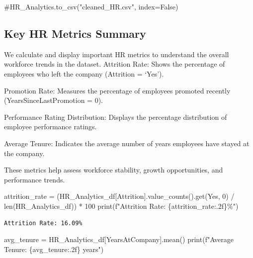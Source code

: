 \documentclass[
  letterpaper,
  DIV=11,
  numbers=noendperiod]{scrartcl}
\newenvironment{Shaded}{\begin{snugshade}}{\end{snugshade}}
\newcommand{\BuiltInTok}[1]{\textcolor[rgb]{0.00,0.23,0.31}{#1}}
\newcommand{\CommentTok}[1]{\textcolor[rgb]{0.37,0.37,0.37}{#1}}
\newcommand{\DecValTok}[1]{\textcolor[rgb]{0.68,0.00,0.00}{#1}}
\newcommand{\NormalTok}[1]{\textcolor[rgb]{0.00,0.23,0.31}{#1}}
\newcommand{\OperatorTok}[1]{\textcolor[rgb]{0.37,0.37,0.37}{#1}}
\newcommand{\SpecialCharTok}[1]{\textcolor[rgb]{0.37,0.37,0.37}{#1}}
\newcommand{\SpecialStringTok}[1]{\textcolor[rgb]{0.13,0.47,0.30}{#1}}
\newcommand{\StringTok}[1]{\textcolor[rgb]{0.13,0.47,0.30}{#1}}
\begin{document}
\begin{Shaded}
\begin{Highlighting}[]
\CommentTok{\#HR\_Analytics.to\_csv("cleaned\_HR.csv", index=False)}
\end{Highlighting}
\end{Shaded}

\subsection{Key HR Metrics Summary}\label{key-hr-metrics-summary}

We calculate and display important HR metrics to understand the overall
workforce trends in the dataset. Attrition Rate: Shows the percentage of
employees who left the company (Attrition = `Yes').

Promotion Rate: Measures the percentage of employees promoted recently
(YearsSinceLastPromotion = 0).

Performance Rating Distribution: Displays the percentage distribution of
employee performance ratings.

Average Tenure: Indicates the average number of years employees have
stayed at the company.

These metrics help assess workforce stability, growth opportunities, and
performance trends.

\begin{Shaded}
\begin{Highlighting}[]
\NormalTok{attrition\_rate }\OperatorTok{=}\NormalTok{ (HR\_Analytics\_df[}\StringTok{\textquotesingle{}Attrition\textquotesingle{}}\NormalTok{].value\_counts().get(}\StringTok{\textquotesingle{}Yes\textquotesingle{}}\NormalTok{, }\DecValTok{0}\NormalTok{) }\OperatorTok{/} \BuiltInTok{len}\NormalTok{(HR\_Analytics\_df)) }\OperatorTok{*} \DecValTok{100}
\BuiltInTok{print}\NormalTok{(}\SpecialStringTok{f"Attrition Rate: }\SpecialCharTok{\{}\NormalTok{attrition\_rate}\SpecialCharTok{:.2f\}}\SpecialStringTok{\%"}\NormalTok{)}
\end{Highlighting}
\end{Shaded}

\begin{verbatim}
Attrition Rate: 16.09%
\end{verbatim}

\begin{Shaded}
\begin{Highlighting}[]
\NormalTok{avg\_tenure }\OperatorTok{=}\NormalTok{ HR\_Analytics\_df[}\StringTok{\textquotesingle{}YearsAtCompany\textquotesingle{}}\NormalTok{].mean()}
\BuiltInTok{print}\NormalTok{(}\SpecialStringTok{f"Average Tenure: }\SpecialCharTok{\{}\NormalTok{avg\_tenure}\SpecialCharTok{:.2f\}}\SpecialStringTok{ years"}\NormalTok{)}
\end{Highlighting}
\end{Shaded}
\end{document}
